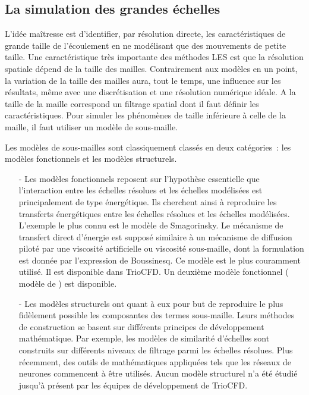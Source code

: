\subsection{La simulation des grandes \'echelles}

L'id\'ee ma\^itresse est d'identifier, par r\'esolution directe, les caract\'eristiques de grande taille de l'\'ecoulement en ne mod\'elisant que des mouvements de petite taille. Une caract\'eristique tr\`es importante des m\'ethodes LES est que la r\'esolution spatiale d\'epend de la taille des mailles. Contrairement aux mod\`eles en un point, la variation de la taille des mailles aura, tout le temps, une influence sur les r\'esultats, m\^eme avec une discr\'etisation et une r\'esolution num\'erique id\'eale. A la taille de la maille correspond un filtrage spatial dont il faut d\'efinir les caract\'eristiques. Pour simuler les ph\'enom\`enes de taille inf\'erieure \`a celle de la maille, il faut utiliser un mod\`ele de sous-maille. 

Les mod\`eles de sous-mailles sont classiquement class\'es en deux cat\'egories~: les mod\`eles fonctionnels et les mod\`eles structurels.

\begin{itemize}
\item[-]
 Les mod\`eles fonctionnels reposent sur l'hypoth\`ese essentielle que l'interaction entre les \'echelles r\'esolues et les \'echelles mod\'elis\'ees est principalement de type \'energ\'etique. Ils cherchent ainsi \`a reproduire les transferts \'energ\'etiques entre les \'echelles r\'esolues et les \'echelles mod\'elis\'ees. 
L'exemple le plus connu est le mod\`ele de Smagorinsky. Le m\'ecanisme de transfert direct  d'\'energie est suppos\'e similaire \`a un m\'ecanisme de diffusion pilot\'e par une viscosit\'e artificielle ou viscosit\'e sous-maille, dont la formulation est donn\'ee par l'expression de Boussinesq. Ce mod\`ele est le plus couramment utilis\'e. Il est disponible dans TrioCFD.  Un deuxi\`eme mod\`ele fonctionnel ( mod\`ele de {}) est disponible.

\item[-]
Les mod\`eles structurels ont quant \`a eux pour but de reproduire le plus fid\`element possible les composantes des termes sous-maille. Leurs m\'ethodes de construction se  basent sur diff\'erents principes de d\'eveloppement math\'ematique. Par exemple, les mod\`eles de similarit\'e d'\'echelles sont construits sur diff\'erents niveaux de filtrage parmi les \'echelles r\'esolues. Plus r\'ecemment, des outils de math\'ematiques appliqu\'ees tels que les r\'eseaux de neurones commencent \`a \^etre utilis\'es. Aucun mod\`ele structurel n'a \'et\'e \'etudi\'e jusqu'\`a pr\'esent par les \'equipes de d\'eveloppement de TrioCFD. \\
\end{itemize}

